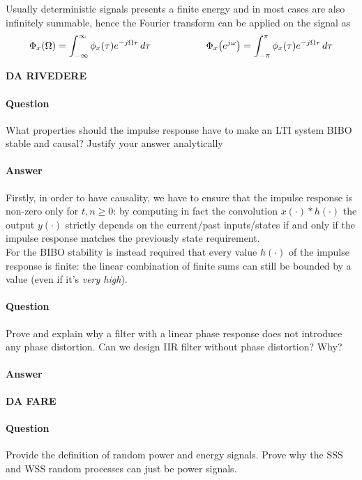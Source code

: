 	
	Usually deterministic signals presents a finite energy and in most cases are also infinitely summable, hence the Fourier transform can be applied on the signal as
	\[ \Phi_x(\Omega) = \int_{-\infty}^\infty \phi_x(\tau) e^{-j\Omega \tau}\, d\tau \hspace{2cm} \Phi_x \big(e^{j\omega}\big) = \int_{-\pi}^\pi \phi_x(\tau) e^{-j\Omega \tau}\, d\tau \]
	
	\textbf{DA RIVEDERE}

\newquestion
	\paragraph{Question} What properties should the impulse response have to make an LTI system BIBO stable and causal? Justify your answer analytically
	
	\paragraph{Answer} Firstly, in order to have causality, we have to ensure that the impulse response is non-zero only for $t,n\geq 0$: by computing in fact the convolution $x(\cdot)*h(\cdot)$ the output $y(\cdot)$ strictly depends on the current/past inputs/states if and only if the impulse response matches the previously state requirement.\\
	For the BIBO stability is instead required that every value $h(\cdot)$ of the impulse response is finite: the linear combination of finite sums can still be bounded by a value (even if it's \textit{very high}).
	
\newquestion
	\paragraph{Question} Prove and explain why a filter with a linear phase response does not introduce any phase distortion. Can we design IIR filter without phase distortion? Why?

	
	\paragraph{Answer} \textbf{DA FARE}
	
\newquestion
	\paragraph{Question} Provide the definition of random power and energy signals. Prove why the SSS and WSS random processes can just be power signals.
	 
